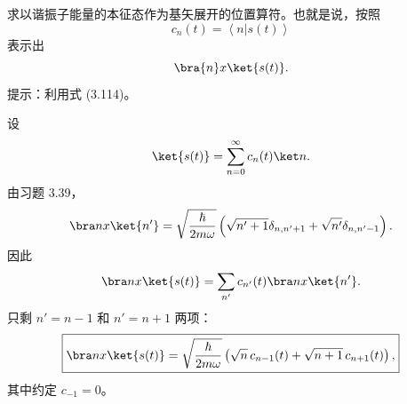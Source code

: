 \begin{question}
求以谐振子能量的本征态作为基矢展开的位置算符。也就是说，按照
\[
c_n(t)=\left\langle n|s(t) \right\rangle
\]
表示出
\[
\bra{n}x\ket{s(t)}.
\]
提示：利用式 (3.114)。

\par\smallskip
{}

\end{question}
\begin{solution}
设
\[
\ket{s(t)}=\sum_{n=0}^{\infty}c_n(t)\ket n.
\]
由习题 3.39，
\[
\bra n x\ket{n'}=\sqrt{\frac{\hbar}{2m\omega}}
\left(\sqrt{n'+1}\delta_{n,n'+1}+\sqrt{n'}\delta_{n,n'-1}\right).
\]
因此
\[
\bra n x\ket{s(t)}=\sum_{n'}c_{n'}(t)\bra n x\ket{n'}.
\]
只剩 $n'=n-1$ 和 $n'=n+1$ 两项：
\[
\boxed{\bra n x\ket{s(t)}=
\sqrt{\frac{\hbar}{2m\omega}}
\left(\sqrt n\,c_{n-1}(t)+\sqrt{n+1}\,c_{n+1}(t)\right),}
\]
其中约定 $c_{-1}=0$。
\end{solution}

